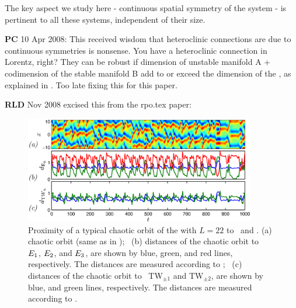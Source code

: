 The key aspect
we study here - continuous spatial symmetry of the system -
is pertinent to all these systems, independent of their size.

{\bf PC} 10 Apr 2008:
    This received wisdom that heteroclinic connections
    are due to continuous symmetries is nonsense. You have a
    heteroclinic connection in Lorentz, right? They can be
    robust if dimension of unstable manifold A + codimension
    of the stable manifold B add to or exceed the dimension
    of the \statesp, as explained in . Too
    late fixing this for this paper.

{\bf RLD} Nov 2008  excised this from the rpo.tex paper:

\begin{figure}[t]
\begin{center}
\includegraphics[width=0.9\textwidth, clip=true]{../figs/ks_prox_eq_tw.eps}
\end{center}
\caption{\color{blue}
Proximity of a typical chaotic orbit of the \KSe with $L =
22$ to \eqva\ and \reqva. (a) chaotic orbit (same as in
); ~(b) distances of the chaotic orbit to
\eqva\ $E_{1}$, $E_{2}$, and $E_{3}$, are shown by
blue, green, and red lines, respectively. The distances are
measured according to ; ~(c) distances of
the chaotic orbit to \reqva\ TW$_{\pm 1}$ and TW$_{\pm 2}$,
are shown by blue, and green lines, respectively. The
distances are measured according to .
     } \label{f:ks_prox_eq}
\end{figure}



